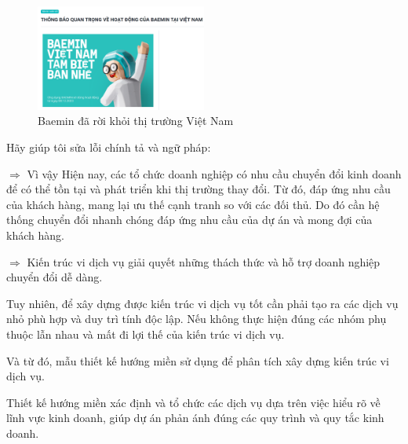 \begin{figure}[H]

\centering

\includegraphics[width = 0.5\textwidth]{pictures/Baemin/main.png}

\caption{Baemin đã rời khỏi thị trường Việt Nam}

\end{figure}


Hãy giúp tôi sửa lỗi chính tả và ngữ pháp:

$\Rightarrow$ Vì vậy Hiện nay, các tổ chức doanh nghiệp có nhu cầu chuyển đổi kinh doanh để có thể tồn tại và phát triển khi thị trường thay đổi. Từ đó, đáp ứng nhu cầu của khách hàng, mang lại ưu thế cạnh tranh so với các đối thủ. Do đó cần hệ thống chuyển đổi nhanh chóng đáp ứng nhu cầu của dự án và mong đợi của khách hàng.

$\Rightarrow$ Kiến trúc vi dịch vụ giải quyết những thách thức và hỗ trợ doanh nghiệp chuyển đổi dễ dàng.

Tuy nhiên, để xây dựng được kiến trúc vi dịch vụ tốt cần phải tạo ra các dịch vụ nhỏ phù hợp và duy trì tính độc lập. Nếu không thực hiện đúng các nhóm phụ thuộc lẫn nhau và mất đi lợi thế của kiến trúc vi dịch vụ.

Và từ đó, mẫu thiết kế hướng miền sử dụng để phân tích xây dựng kiến trúc vi dịch vụ.


Thiết kế hướng miền xác định và tổ chức các dịch vụ dựa trên việc hiểu rõ về lĩnh vực kinh doanh, giúp dự án phản ánh đúng các quy trình và quy tắc kinh doanh.





